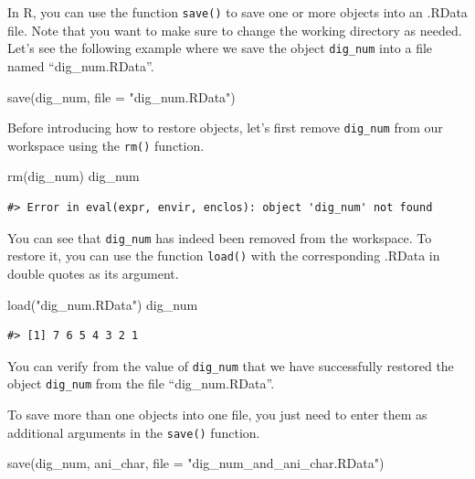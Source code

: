 \documentclass[
]{book}
\newenvironment{Shaded}{\begin{snugshade}}{\end{snugshade}}
\newcommand{\AttributeTok}[1]{\textcolor[rgb]{0.77,0.63,0.00}{#1}}
\newcommand{\FunctionTok}[1]{\textcolor[rgb]{0.00,0.00,0.00}{#1}}
\newcommand{\NormalTok}[1]{#1}
\newcommand{\StringTok}[1]{\textcolor[rgb]{0.31,0.60,0.02}{#1}}
\begin{document}
In R, you can use the function \texttt{save()} to save one or more objects into an .RData file. Note that you want to make sure to change the working directory as needed. Let's see the following example where we save the object \texttt{dig\_num} into a file named ``dig\_num.RData''.

\begin{Shaded}
\begin{Highlighting}[]
\FunctionTok{save}\NormalTok{(dig\_num, }\AttributeTok{file =} \StringTok{"dig\_num.RData"}\NormalTok{)}
\end{Highlighting}
\end{Shaded}

Before introducing how to restore objects, let's first remove \texttt{dig\_num} from our workspace using the \texttt{rm()} function.

\begin{Shaded}
\begin{Highlighting}[]
\FunctionTok{rm}\NormalTok{(dig\_num)}
\NormalTok{dig\_num}
\end{Highlighting}
\end{Shaded}

\begin{verbatim}
#> Error in eval(expr, envir, enclos): object 'dig_num' not found
\end{verbatim}

You can see that \texttt{dig\_num} has indeed been removed from the workspace. To restore it, you can use the function \texttt{load()} with the corresponding .RData in double quotes as its argument.

\begin{Shaded}
\begin{Highlighting}[]
\FunctionTok{load}\NormalTok{(}\StringTok{"dig\_num.RData"}\NormalTok{)}
\NormalTok{dig\_num}
\end{Highlighting}
\end{Shaded}

\begin{verbatim}
#> [1] 7 6 5 4 3 2 1
\end{verbatim}

You can verify from the value of \texttt{dig\_num} that we have successfully restored the object \texttt{dig\_num} from the file ``dig\_num.RData''.

To save more than one objects into one file, you just need to enter them as additional arguments in the \texttt{save()} function.

\begin{Shaded}
\begin{Highlighting}[]
\FunctionTok{save}\NormalTok{(dig\_num, ani\_char, }\AttributeTok{file =} \StringTok{"dig\_num\_and\_ani\_char.RData"}\NormalTok{)}
\end{Highlighting}
\end{Shaded}
\end{document}
